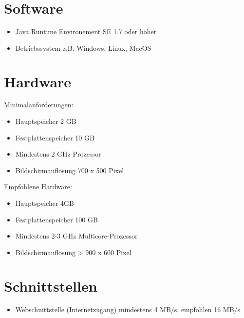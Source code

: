 \section{Software}
   \begin{itemize}
      \item Java Runtime Environement SE 1.7 oder höher
      \item Betriebssystem z.B. Windows, Linux, MacOS
   \end{itemize}
\section{Hardware}
	Minimalanforderungen:
   \begin{itemize}
      \item Hauptspeicher 2 GB
      \item Festplattenspeicher 10 GB
      \item Mindestens 2 GHz Prozessor
      \item Bildschirmauflösung 700 x 500 Pixel
   \end{itemize}
   Empfohlene Hardware:
   \begin{itemize}
      \item Hauptspeicher 4GB
      \item Festplattenspeicher 100 GB
      \item Mindestens 2-3 GHz Multicore-Prozessor
      \item Bildschirmauflösung > 900 x 600 Pixel
   \end{itemize}
\section{Schnittstellen}
   \begin{itemize}
   \item Webschnittstelle (Internetzugang) mindestens 4 MB/s, empfohlen 16 MB/s
   \end{itemize}
